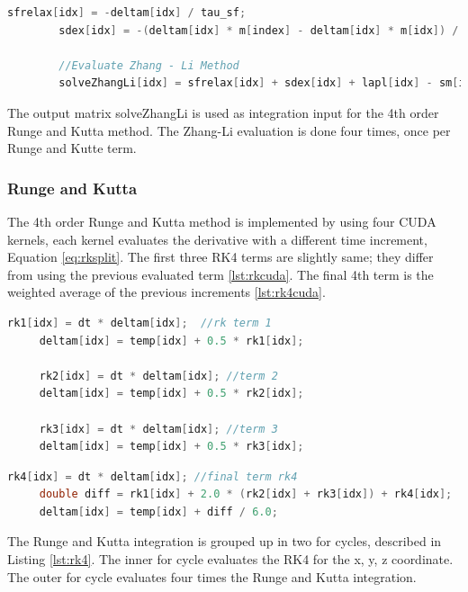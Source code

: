 \begin{lstlisting}[language=C++, label={lst:zhangcuda}, caption={Zhang-Li evaluation}]
		sfrelax[idx] = -deltam[idx] / tau_sf;
		sdex[idx] = -(deltam[idx] * m[index] - deltam[idx] * m[idx]) / tau_sd;
		
		//Evaluate Zhang - Li Method
        solveZhangLi[idx] = sfrelax[idx] + sdex[idx] + lapl[idx] - sm[idx];
\end{lstlisting}

The output matrix {\listf solveZhangLi} is used as integration input for the 4th order Runge and Kutta method. The Zhang-Li evaluation is done four times, once per Runge and Kutte term.

\subsubsection{Runge and Kutta}
 
The 4th order Runge and Kutta method is implemented by using four CUDA kernels, each kernel evaluates the derivative with a different time increment, Equation \ref{eq:rksplit}. The first three RK4 terms are slightly same; they differ from using the previous evaluated term \ref{lst:rkcuda}. The final 4th term is the weighted average of the previous increments \ref{lst:rk4cuda}.

\begin{lstlisting}[language=C++, label={lst:rkcuda}, caption={Runge and Kutta 1st, 2nd and 3rd terms}]
     rk1[idx] = dt * deltam[idx];  //rk term 1
     deltam[idx] = temp[idx] + 0.5 * rk1[idx];
     
     rk2[idx] = dt * deltam[idx]; //term 2
     deltam[idx] = temp[idx] + 0.5 * rk2[idx];
     
     rk3[idx] = dt * deltam[idx]; //term 3
     deltam[idx] = temp[idx] + 0.5 * rk3[idx];
\end{lstlisting}
    
\begin{lstlisting}[language=C++, label={lst:rk4cuda}, caption={4th term of the Runge and Kutta integration}] 
     rk4[idx] = dt * deltam[idx]; //final term rk4
     double diff = rk1[idx] + 2.0 * (rk2[idx] + rk3[idx]) + rk4[idx];
     deltam[idx] = temp[idx] + diff / 6.0;	
\end{lstlisting}


The Runge and Kutta integration is grouped up in two {\listf for} cycles, described in Listing \ref{lst:rk4}. The inner {\listf for} cycle evaluates the RK4 for the x, y, z coordinate. The outer {\listf for} cycle evaluates four times the Runge and Kutta integration.

